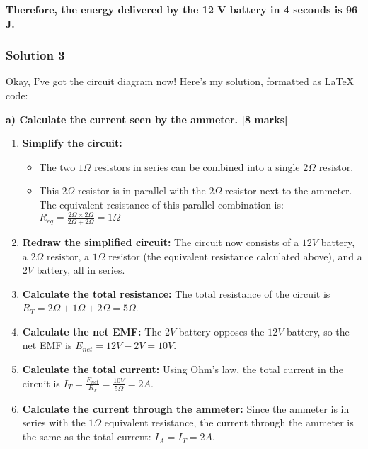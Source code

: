 \documentclass{article}
\begin{document}
\textbf{Therefore, the energy delivered by the 12 V battery in 4 seconds is 96 J.} 

\subsubsection{Solution 3}
Okay, I've got the circuit diagram now! Here's my solution, formatted as LaTeX code:

\textbf{a) Calculate the current seen by the ammeter. [8 marks]}

\begin{enumerate}
\item \textbf{Simplify the circuit:} 
    \begin{itemize}
    \item The two $1 \Omega$ resistors in series can be combined into a single $2 \Omega$ resistor.
    \item This $2 \Omega$ resistor is in parallel with the $2 \Omega$ resistor next to the ammeter. The equivalent resistance of this parallel combination is: 
    $R_{eq} = \frac{2 \Omega \times 2 \Omega}{2 \Omega + 2 \Omega} = 1 \Omega$
    \end{itemize}

\item \textbf{Redraw the simplified circuit:} The circuit now consists of a $12V$ battery, a $2 \Omega$ resistor, a $1 \Omega$ resistor (the equivalent resistance calculated above), and a $2V$ battery, all in series.

\item \textbf{Calculate the total resistance:} The total resistance of the circuit is $R_T = 2 \Omega + 1 \Omega + 2 \Omega = 5 \Omega$.

\item \textbf{Calculate the net EMF:} The $2V$ battery opposes the $12V$ battery, so the net EMF is $E_{net} = 12V - 2V = 10V$.

\item \textbf{Calculate the total current:} Using Ohm's law, the total current in the circuit is $I_T = \frac{E_{net}}{R_T} = \frac{10V}{5 \Omega} = 2A$.

\item \textbf{Calculate the current through the ammeter:} Since the ammeter is in series with the $1 \Omega$ equivalent resistance, the current through the ammeter is the same as the total current: $I_A = I_T = 2A$.

\end{enumerate}
\end{document}

